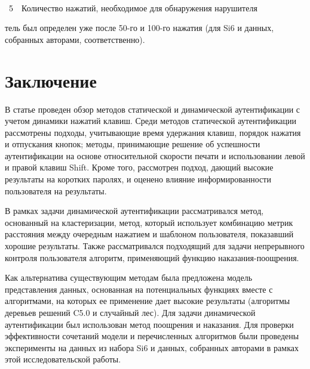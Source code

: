 \begin{multicols}{2}
\vspace*{-1pt}

\begin{center}  %
  \mbox{%
 \epsfxsize=75.76mm
 }
 \end{center}
 \vspace*{3pt}
{{\figurename~5}\ \ \small{Количество нажатий, необходимое для обнаружения нарушителя}}

\vspace*{12pt}

\noindent
тель был определен уже после 50-го и 100-го нажатия (для Si6 и
данных, собранных авторами, соответственно).

\vspace*{-2pt}

\section{Заключение}

В статье проведен обзор методов статической и динамической
аутентификации с учетом динамики нажатий клавиш. Среди методов
статической аутентификации рассмотрены подходы, учитывающие время
удержания клавиш, порядок нажатия и отпускания кнопок; методы,
принимающие решение об успешности аутентификации на основе
относительной скорости печати и использовании левой и правой клавиш
{\sf Shift}. Кроме того, рассмотрен подход, дающий высокие
результаты на коротких паролях, и оценено влияние информированности
пользователя на результаты.

В рамках задачи динамической аутентификации рассматривался метод,
основанный на кластеризации, метод, который использует комбинацию
метрик расстояния между очередным нажатием и шаблоном пользователя,
показавший хорошие результаты. Также рассматривался подходящий для
задачи непрерывного контроля пользователя алгоритм, применяющий
функцию на\-ка\-за\-ния-по\-ощре\-ния.

Как альтернатива существующим методам была предложена модель
представления данных, основанная на потенциальных функциях вместе с
алгоритмами, на которых ее применение дает высокие результаты
(алгоритмы деревьев решений C5.0 и случайный лес). Для задачи
динамической аутентификации был использован метод поощрения и
наказания. Для проверки эффективности сочетаний модели и
перечисленных алгоритмов были проведены эксперименты на данных из
набора Si6 и данных, собранных авторами в рамках этой
исследовательской работы.


\end{multicols}
